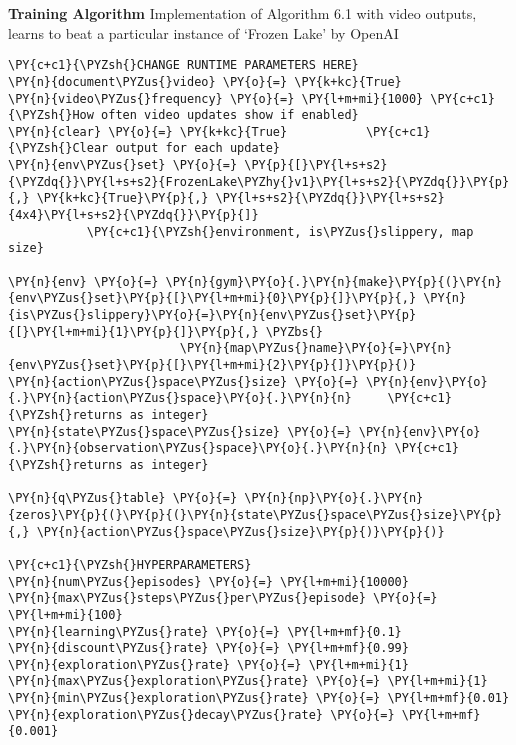     \textbf{Training Algorithm} \textbar{} Implementation of Algorithm 6.1 with video outputs, learns to beat a particular instance of `Frozen Lake' by OpenAI

    \begin{tcolorbox}[breakable, size=fbox, boxrule=1pt, pad at break*=1mm,colback=cellbackground, colframe=cellborder]
\begin{Verbatim}[commandchars=\\\{\}]
\PY{c+c1}{\PYZsh{}CHANGE RUNTIME PARAMETERS HERE}
\PY{n}{document\PYZus{}video} \PY{o}{=} \PY{k+kc}{True}
\PY{n}{video\PYZus{}frequency} \PY{o}{=} \PY{l+m+mi}{1000} \PY{c+c1}{\PYZsh{}How often video updates show if enabled}
\PY{n}{clear} \PY{o}{=} \PY{k+kc}{True}           \PY{c+c1}{\PYZsh{}Clear output for each update}
\PY{n}{env\PYZus{}set} \PY{o}{=} \PY{p}{[}\PY{l+s+s2}{\PYZdq{}}\PY{l+s+s2}{FrozenLake\PYZhy{}v1}\PY{l+s+s2}{\PYZdq{}}\PY{p}{,} \PY{k+kc}{True}\PY{p}{,} \PY{l+s+s2}{\PYZdq{}}\PY{l+s+s2}{4x4}\PY{l+s+s2}{\PYZdq{}}\PY{p}{]} 
           \PY{c+c1}{\PYZsh{}environment, is\PYZus{}slippery, map size}

\PY{n}{env} \PY{o}{=} \PY{n}{gym}\PY{o}{.}\PY{n}{make}\PY{p}{(}\PY{n}{env\PYZus{}set}\PY{p}{[}\PY{l+m+mi}{0}\PY{p}{]}\PY{p}{,} \PY{n}{is\PYZus{}slippery}\PY{o}{=}\PY{n}{env\PYZus{}set}\PY{p}{[}\PY{l+m+mi}{1}\PY{p}{]}\PY{p}{,} \PYZbs{}
                        \PY{n}{map\PYZus{}name}\PY{o}{=}\PY{n}{env\PYZus{}set}\PY{p}{[}\PY{l+m+mi}{2}\PY{p}{]}\PY{p}{)}
\PY{n}{action\PYZus{}space\PYZus{}size} \PY{o}{=} \PY{n}{env}\PY{o}{.}\PY{n}{action\PYZus{}space}\PY{o}{.}\PY{n}{n}     \PY{c+c1}{\PYZsh{}returns as integer}
\PY{n}{state\PYZus{}space\PYZus{}size} \PY{o}{=} \PY{n}{env}\PY{o}{.}\PY{n}{observation\PYZus{}space}\PY{o}{.}\PY{n}{n} \PY{c+c1}{\PYZsh{}returns as integer}

\PY{n}{q\PYZus{}table} \PY{o}{=} \PY{n}{np}\PY{o}{.}\PY{n}{zeros}\PY{p}{(}\PY{p}{(}\PY{n}{state\PYZus{}space\PYZus{}size}\PY{p}{,} \PY{n}{action\PYZus{}space\PYZus{}size}\PY{p}{)}\PY{p}{)}

\PY{c+c1}{\PYZsh{}HYPERPARAMETERS}
\PY{n}{num\PYZus{}episodes} \PY{o}{=} \PY{l+m+mi}{10000}
\PY{n}{max\PYZus{}steps\PYZus{}per\PYZus{}episode} \PY{o}{=} \PY{l+m+mi}{100}
\PY{n}{learning\PYZus{}rate} \PY{o}{=} \PY{l+m+mf}{0.1}          
\PY{n}{discount\PYZus{}rate} \PY{o}{=} \PY{l+m+mf}{0.99}            
\PY{n}{exploration\PYZus{}rate} \PY{o}{=} \PY{l+m+mi}{1}
\PY{n}{max\PYZus{}exploration\PYZus{}rate} \PY{o}{=} \PY{l+m+mi}{1}
\PY{n}{min\PYZus{}exploration\PYZus{}rate} \PY{o}{=} \PY{l+m+mf}{0.01}     
\PY{n}{exploration\PYZus{}decay\PYZus{}rate} \PY{o}{=} \PY{l+m+mf}{0.001}  


\end{Verbatim}
\end{tcolorbox}
